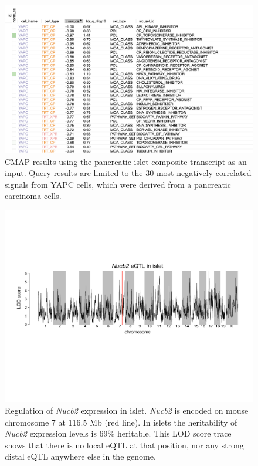 \documentclass[
]{article}
\begin{document}
\begin{figure}[ht!]
\includegraphics[width=\textwidth]{Figures/Supp_Fig_Islet_YAPC.png} 
\caption{CMAP results using the pancreatic islet composite transcript as 
an input. Query results are limited to the 30 most negatively correlated 
signals from YAPC cells, which were derived from a pancreatic carcinoma cells.
}
\label{fig:clue_islet_yapc}
\end{figure}

\begin{figure}[ht!]
\includegraphics[width=\textwidth]{Figures/Supplemental_FigX_Nucb2_eQTL.pdf} 
\caption{Regulation of \textit{Nucb2} expression in islet. \textit{Nucb2} 
is encoded on mouse chromosome 7 at 116.5 Mb (red line). In islets the 
heritability of \textit{Nucb2} expression levels is 69\% heritable. This 
LOD score trace shows that there is no local eQTL at that position, nor 
any strong distal eQTL anywhere else in the genome. 
}
\label{fig:Nucb2_eqtl}
\end{figure}

\clearpage



\end{document}
